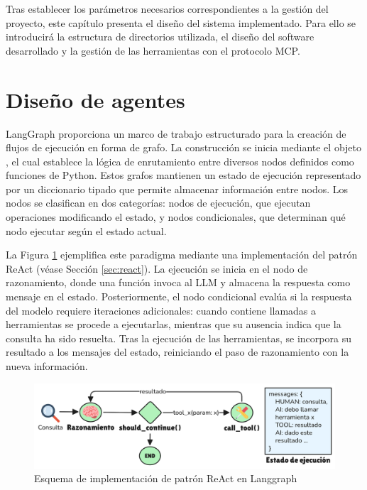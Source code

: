 Tras establecer los parámetros necesarios correspondientes a la gestión del proyecto, este capítulo presenta el diseño del sistema implementado. Para ello se introducirá la estructura de directorios utilizada, el diseño del software desarrollado y la gestión de las herramientas con el protocolo MCP. 

\section{Diseño de agentes}
LangGraph proporciona un marco de trabajo estructurado para la creación de flujos de ejecución en forma de grafo. La construcción se inicia mediante el objeto , el cual establece la lógica de enrutamiento entre diversos nodos definidos como funciones de Python. Estos grafos mantienen un estado de ejecución representado por un diccionario tipado que permite almacenar información entre nodos. Los nodos se clasifican en dos categorías: nodos de ejecución, que ejecutan operaciones modificando el estado, y nodos condicionales, que determinan qué nodo ejecutar según el estado actual.

La Figura \ref{fig:react} ejemplifica este paradigma mediante una implementación del patrón ReAct (véase Sección \ref{sec:react}). La ejecución se inicia en el nodo de razonamiento, donde una función invoca al LLM y almacena la respuesta como mensaje en el estado. Posteriormente, el nodo condicional  evalúa si la respuesta del modelo requiere iteraciones adicionales: cuando contiene llamadas a herramientas se procede a ejecutarlas, mientras que su ausencia indica que la consulta ha sido resuelta. Tras la ejecución de las herramientas, se incorpora su resultado a los mensajes del estado, reiniciando el paso de razonamiento con la nueva información.

\begin{figure}[hbtp]
  \centering
  \includegraphics[scale=0.2]{figures/react.png}
  \caption{Esquema de implementación de patrón ReAct en Langgraph}
  \label{fig:react}
\end{figure}

